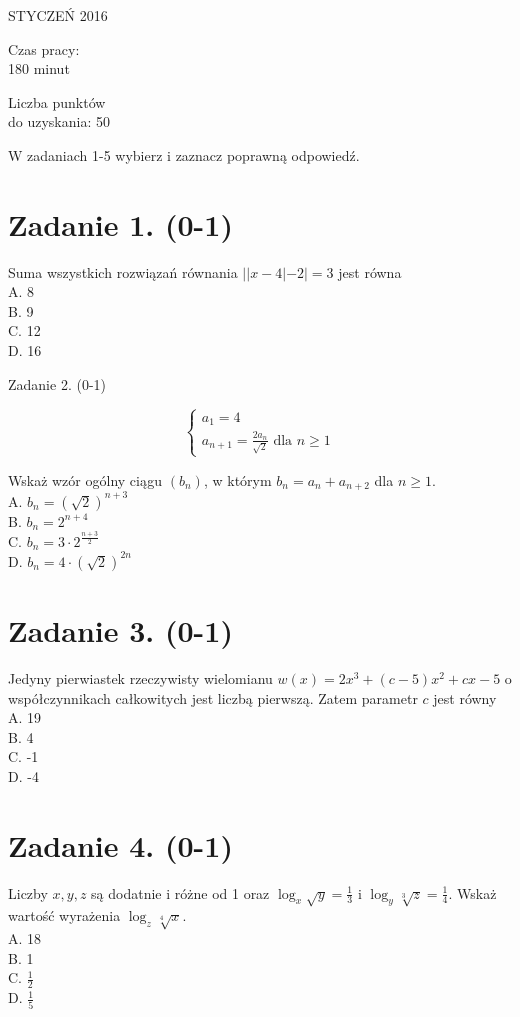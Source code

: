 \documentclass[10pt]{article}
\begin{document}
STYCZEŃ 2016

Czas pracy:\\
180 minut

Liczba punktów\\
do uzyskania: 50

W zadaniach 1-5 wybierz i zaznacz poprawną odpowiedź.

\section*{Zadanie 1. (0-1)}
Suma wszystkich rozwiązań równania \(||x-4|-2|=3\) jest równa\\
A. 8\\
B. 9\\
C. 12\\
D. 16

Zadanie 2. (0-1)

\[
\left\{\begin{array}{l}
a_{1}=4 \\
a_{n+1}=\frac{2 a_{n}}{\sqrt{2}} \text { dla } n \geqslant 1
\end{array}\right.
\]

Wskaż wzór ogólny ciągu \(\left(b_{n}\right)\), w którym \(b_{n}=a_{n}+a_{n+2}\) dla \(n \geqslant 1\).\\
A. \(b_{n}=(\sqrt{2})^{n+3}\)\\
B. \(b_{n}=2^{n+4}\)\\
C. \(b_{n}=3 \cdot 2^{\frac{n+3}{2}}\)\\
D. \(b_{n}=4 \cdot(\sqrt{2})^{2 n}\)

\section*{Zadanie 3. (0-1)}
Jedyny pierwiastek rzeczywisty wielomianu \(w(x)=2 x^{3}+(c-5) x^{2}+c x-5\) o współczynnikach całkowitych jest liczbą pierwszą. Zatem parametr \(c\) jest równy\\
A. 19\\
B. 4\\
C. -1\\
D. -4

\section*{Zadanie 4. (0-1)}
Liczby \(x, y, z\) są dodatnie i różne od 1 oraz \(\log _{x} \sqrt{y}=\frac{1}{3}\) i \(\log _{y} \sqrt[3]{z}=\frac{1}{4}\). Wskaż wartość wyrażenia \(\log _{z} \sqrt[4]{x}\).\\
A. 18\\
B. 1\\
C. \(\frac{1}{2}\)\\
D. \(\frac{1}{5}\)
\end{document}
